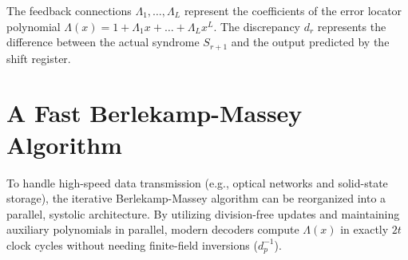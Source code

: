 \documentclass[12pt,a4paper]{article}
\begin{document}
\begin{tcolorbox}[tikzbox, title={Massey's LFSR Synthesis Model}]
\centering
{}
\end{tcolorbox}

The feedback connections $\Lambda_1, \dots, \Lambda_L$ represent the coefficients of the error locator polynomial $\Lambda(x) = 1 + \Lambda_1 x + \dots + \Lambda_L x^L$. The discrepancy $d_r$ represents the difference between the actual syndrome $S_{r+1}$ and the output predicted by the shift register.

\section{A Fast Berlekamp-Massey Algorithm}

To handle high-speed data transmission (e.g., optical networks and solid-state storage), the iterative Berlekamp-Massey algorithm can be reorganized into a parallel, systolic architecture.
By utilizing division-free updates and maintaining auxiliary polynomials in parallel, modern decoders compute $\Lambda(x)$ in exactly $2t$ clock cycles without needing finite-field inversions ($d_p^{-1}$).

\end{document}

